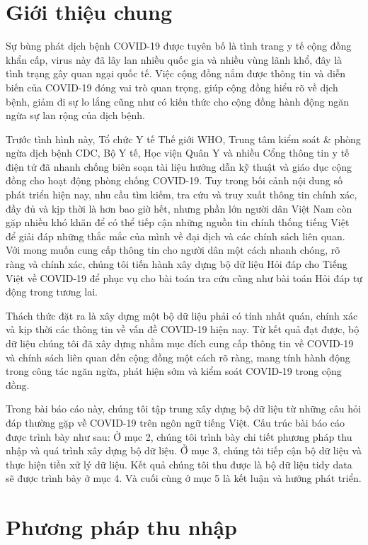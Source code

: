 \documentclass[runningheads]{llncs}
\begin{document}
\section{Giới thiệu chung}

Sự bùng phát dịch bệnh COVID-19 được tuyên bố là tình trang y tế cộng đồng khẩn cấp, virus này đã lây lan nhiều quốc gia và nhiều vùng lãnh khổ, đây là tình trạng gây quan ngại quốc tế. Việc cộng đồng nắm được thông tin và diễn biến của COVID-19 đóng vai trò quan trọng, giúp cộng đồng hiểu rõ về dịch bệnh, giảm đi sự lo lắng cũng như có kiến thức cho cộng đồng hành động ngăn ngừa sự lan rộng của dịch bệnh.

Trước tình hình này, Tổ chức Y tế Thế giới WHO, Trung tâm kiểm soát \& phòng ngừa dịch bệnh CDC, Bộ Y tế, Học viện Quân Y và nhiều Cổng thông tin y tế điện tử đã nhanh chống biên soạn tài liệu hướng dẫn kỹ thuật và giáo dục cộng đồng cho hoạt động phòng chống COVID-19. Tuy trong bối cảnh nội dung số phát triển hiện nay, nhu cầu tìm kiếm, tra cứu và truy xuất thông tin chính xác, đầy đủ và kịp thời là hơn bao giờ hết, nhưng phần lớn người dân Việt Nam còn gặp nhiều khó khăn để có thể tiếp cận những nguồn tin chính thống tiếng Việt để giải đáp những thắc mắc của mình về đại dịch và các chính sách liên quan.
Với mong muốn cung cấp thông tin cho người dân một cách nhanh chóng, rõ ràng và chính xác, chúng tôi tiến hành xây dựng bộ dữ liệu Hỏi đáp cho Tiếng Việt về COVID-19 để phục vụ cho bài toán tra cứu cũng như bài toán Hỏi đáp tự động trong tương lai.

Thách thức đặt ra là xây dựng một bộ dữ liệu phải có tính nhất quán, chính xác và kịp thời các thông tin về vấn đề COVID-19 hiện nay. Từ kết quả đạt được, bộ dữ liệu chúng tôi đã xây dựng nhằm mục đích cung cấp thông tin về COVID-19 và chính sách liên quan đến cộng đồng một cách rõ ràng, mang tính hành động trong công tác ngăn ngừa, phát hiện sớm và kiểm soát COVID-19 trong cộng đồng.

Trong bài báo cáo này, chúng tôi tập trung xây dựng bộ dữ liệu từ những câu hỏi đáp thường gặp về COVID-19 trên ngôn ngữ tiếng Việt. Cấu trúc bài báo cáo được trình bày như sau: Ở mục 2, chúng tôi trình bày chi tiết phương pháp thu nhập và quá trình xây dựng bộ dữ liệu. Ở mục 3, chúng tôi tiếp cận bộ dữ liệu và thực hiện tiền xử lý dữ liệu. Kết quả chúng tôi thu được là bộ dữ liệu tidy data sẽ được trình bày ở mục 4. Và cuối cùng ở mục 5 là kết luận và hướng phát triển.

\section{Phương pháp thu nhập}
\end{document}
